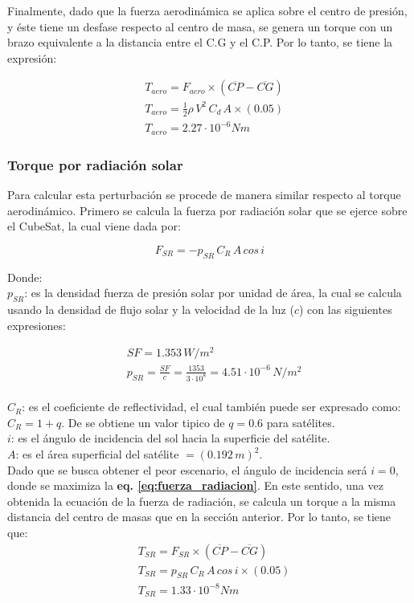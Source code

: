 Finalmente, dado que la fuerza aerodinámica se aplica sobre el centro de presión, y éste tiene un desfase respecto al centro de masa, se genera un torque con un brazo equivalente a la distancia entre el C.G y el C.P. Por lo tanto, se tiene la expresión:

$$
\begin{aligned}
		& T_{aero} = F_{aero}\times\left(\overline{CP} - \overline{CG}\right)\\
		& T_{aero} = \frac{1}{2}\rho\,V^2\,C_{d}\,A\times\left(0.05\right) \\
		& T_{aero} =2.27\cdot10^{-6} Nm
\end{aligned}
$$		

 
\subsubsection{Torque por radiación solar}
\hfill \break
Para calcular esta perturbación se procede de manera similar respecto al torque aerodinámico. Primero se calcula la fuerza por radiación solar que se ejerce sobre el CubeSat, la cual viene dada por: 

\begin{equation}\label{eq:fuerza_radiacion}
	F_{SR} = -p_{SR}\,C_{R}\,A\,cos\,i	
\end{equation}

\noindent Donde:\\
$p_{SR}$: es la densidad fuerza de presión solar por unidad de área, la cual se calcula usando la densidad de flujo solar y la velocidad de la luz ($c$) con las siguientes expresiones: 

$$
\begin{aligned}
	& SF = 1.353\,W/m^2\\
	& p_{SR} = \frac{SF}{c} = \frac{1353}{3\cdot10^{8}}=4.51\cdot10^{-6}\,N/m^2	
\end{aligned}
$$
\\
\noindent$C_{R}$: es el coeficiente de reflectividad, el cual también puede ser expresado como: $C_R = 1+q$. De \cite{mcclain2001fundamentals} se obtiene un valor tipico de $q =0.6$ para satélites.\\
$i$: es el ángulo de incidencia del sol hacia la superficie del satélite.\\
$A$: es el área superficial del satélite $= \left(0.192\,m\right)^2$.\\
Dado que se busca obtener el peor escenario, el ángulo de incidencia será $i=0$, donde se maximiza la \textbf{eq. \ref{eq:fuerza_radiacion}}. En este sentido, una vez obtenida la ecuación de la fuerza de radiación, se calcula un torque a la misma distancia del centro de masas que en la sección anterior. Por lo tanto, se tiene que: 
 $$
 \begin{aligned}
 	& T_{SR} = F_{SR}\times\left(\overline{CP} - \overline{CG}\right)\\
 	& T_{SR} = p_{SR}\,C_{R}\,A\,cos\,i\times\left(0.05\right) \\
 	& T_{SR} =1.33\cdot10^{-8} Nm
 \end{aligned}
 $$
